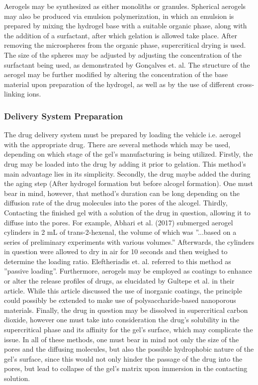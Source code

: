 \documentclass[a4paper,12pt]{article}
\begin{document}
Aerogels may be synthesized as either monoliths or granules.\supercite{stergar_review_2016} Spherical aerogels may also be produced via emulsion polymerization, in which an emulsion is prepared by mixing the hydrogel base with a suitable organic phase, along with the addition of a surfactant, after which gelation is allowed take place. After removing the microspheres from the organic phase, supercritical drying is used. The size of the spheres may be adjusted by adjusting the concentration of the surfactant being used, as demonstrated by Gonçalves et. al.\supercite{goncalves_alginate-based_2016} The structure of the aerogel may be further modified by altering the concentration of the base material upon preparation of the hydrogel, as well as by the use of different cross-linking ions.\supercite{mallepally_superabsorbent_2013}

\subsubsection{Delivery System Preparation}

The drug delivery system must be prepared by loading the vehicle i.e. aerogel with the appropriate drug. There are several methods which may be used, depending on which stage of the gel’s manufacturing is being utilized. Firstly, the drug may be loaded into the drug by adding it prior to gelation. This method’s main advantage lies in its simplicity. Secondly, the drug maybe added the during the aging step (After hydrogel formation but before alcogel formation). One must bear in mind, however, that method’s duration can be long depending on the diffusion rate of the drug molecules into the pores of the alcogel. Thirdly, Contacting the finished gel with a solution of the drug in question, allowing it to diffuse into the pores. For example, Abhari et al. (2017) submerged aerogel cylinders in 2 mL of trans-2-hexenal, the volume of which was ”...based on a series of preliminary experiments with various volumes.” Afterwards, the cylinders in question were allowed to dry in air for 10 seconds and then weighed to determine the loading ratio.\supercite{abhari_structure_2017} Eleftheriadis et. al. referred to this method as ”passive loading”.\supercite{eleftheriadis_evaluation_2016} Furthermore, aerogels may be employed as coatings to enhance or alter the release profiles of drugs, as elucidated by Gultepe et al. in their article. While this article discussed the use of inorganic coatings, the principle could possibly be extended to make use of polysaccharide-based nanoporous materials.\supercite{gultepe_nanoporous_2010} Finally, the drug in question may be dissolved in supercritical carbon dioxide, however one must take into consideration the drug’s solubility in the supercritical phase and its affinity for the gel’s surface, which may complicate the issue. In all of these methods, one must bear in mind not only the size of the pores and the diffusing molecules, but also the possible hydrophobic nature of the gel’s surface, since this would not only hinder the passage of the drug into the pores, but lead to collapse of the gel’s matrix upon immersion in the contacting solution.\supercite{ulker_emerging_2014}
\end{document}
